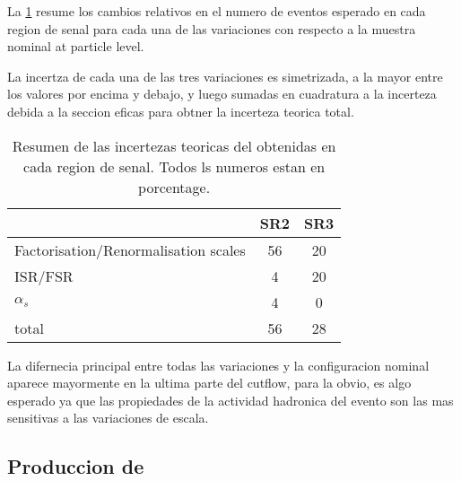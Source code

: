 %

La {\tab} \ref{tab:syst_ttbargam_truth} resume los cambios relativos en el
numero de eventos esperado en cada region de senal para cada una de las
variaciones con respecto a la muestra nominal at particle level.

La incertza de cada una de las tres variaciones es simetrizada, a la mayor
entre los valores por encima y debajo, y luego sumadas en cuadratura
a la incerteza debida a la seccion eficas para obtner la incerteza teorica
total. %

\begin{table}[ht!]
  \centering
  \caption{Resumen de las incertezas teoricas del {\ttgam} obtenidas en cada region de senal.
    Todos ls numeros estan en porcentage.}
  \begin{tabular}{ l | c  c  }
   \hline
    & SR2 & SR3 \\
   \hline
      Factorisation/Renormalisation scales &  56  & 20 \\
      ISR/FSR                              &  4   & 20 \\
      $\alpha_{s}$                         &  4   &  0 \\
      \hline
      \hline
      total				&   56    &   28 \\
      \hline
  \end{tabular}
  \label{tab:syst_ttbargam_truth}
\end{table}

La difernecia principal entre todas las variaciones y la configuracion
nominal aparece mayormente en la ultima parte del cutflow, para la
obvio, es algo esperado ya que las propiedades de la actividad hadronica
del evento son las mas sensitivas a las variaciones de escala.

\subsection{Produccion de {\wgam}}\label{sec:syst_wgamma}

